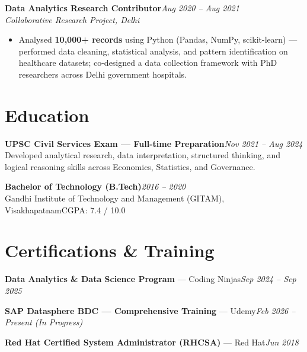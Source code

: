 \documentclass[10pt, letterpaper]{article}
\newcommand{\role}[3]{%
  \vspace{2pt}%
  {\bfseries #1}\hfill{\small\color{muted}\textit{#3}}\\[-2pt]%
  {\small\color{muted}\textit{#2}}%
}
\begin{document}
\role{Data Analytics Research Contributor}{Collaborative Research Project, Delhi}{Aug 2020 – Aug 2021}

\begin{itemize}
  \item Analysed \textbf{10,000+ records} using Python (Pandas, NumPy, scikit-learn) — performed data cleaning, statistical analysis, and pattern identification on healthcare datasets; co-designed a data collection framework with PhD researchers across Delhi government hospitals.
\end{itemize}

\section{Education}

{\bfseries UPSC Civil Services Exam — Full-time Preparation}\hfill{\small\color{muted}\textit{Nov 2021 – Aug 2024}}\\
{\small\color{muted}Developed analytical research, data interpretation, structured thinking, and logical reasoning skills across Economics, Statistics, and Governance.}

\vspace{2pt}
{\bfseries Bachelor of Technology (B.Tech)}\hfill{\small\color{muted}\textit{2016 – 2020}}\\
{\small\color{muted}Gandhi Institute of Technology and Management (GITAM), Visakhapatnam\hfill CGPA: 7.4 / 10.0}

\section{Certifications \& Training}

{\bfseries Data Analytics \& Data Science Program} — Coding Ninjas\hfill{\small\color{muted}\textit{Sep 2024 – Sep 2025}}

\vspace{1pt}
{\bfseries SAP Datasphere BDC — Comprehensive Training} — Udemy\hfill{\small\color{muted}\textit{Feb 2026 – Present \emph{(In Progress)}}}

\vspace{1pt}
{\bfseries Red Hat Certified System Administrator (RHCSA)} — Red Hat\hfill{\small\color{muted}\textit{Jun 2018}}

\end{document}

